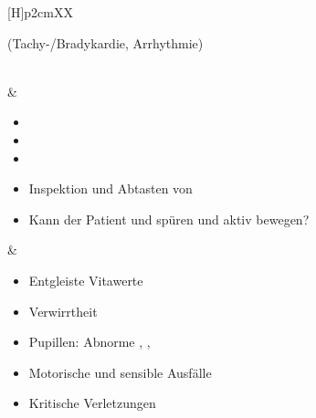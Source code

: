 \begin{WidePar}
\begin{tabularx}{\linewidth}[H]{p{2cm}XX}
\begin{minipage}[t]{\linewidth}
\begin{itemize}
  (Tachy-/Bradykardie, Arrhythmie)
\end{itemize}
\end{minipage}
\\\addlinespace\midrule\addlinespace
{}
&
\begin{minipage}[t]{\linewidth}
\begin{itemize}
  \item {}
  \item {}
  \item {}
  \item[{\tiny\color{Indigo}\ovalbox{Trauma}}] Inspektion
  und Abtasten von
  \item[{\tiny\color{Indigo}\ovalbox{Trauma}}] Kann der
  Patient  und  spüren und aktiv bewegen?
\end{itemize}
\end{minipage}
&
\noindent\color{darkBlue}\itshape\begin{minipage}[t]{\linewidth}
\begin{itemize}
  \item Entgleiste Vitawerte
  \item Verwirrtheit
  \item Pupillen: Abnorme , ,
  \item Motorische und sensible Ausfälle
  \item Kritische Verletzungen
\end{itemize}
\end{minipage}
\\\addlinespace\bottomrule
\end{tabularx}
\end{WidePar}

